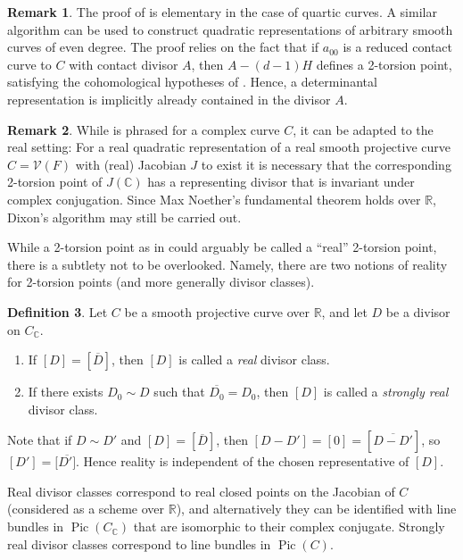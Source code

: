 \documentclass[a4paper,10pt]{amsart}
\theoremstyle{definition}
\newtheorem{Def}{Definition}[section]
\newtheorem{rem}[Def]{Remark}
\theoremstyle{plain}
\newcommand{\Pic}{\operatorname{Pic}}
\newcommand{\cV}{{\mathcal V}}
\newcommand{\C}{{\mathbb C}}
\newcommand{\R}{{\mathbb R}}
\begin{document}
\begin{rem}
The proof of  is elementary in the case of quartic curves. A similar algorithm can be used to construct quadratic representations of arbitrary smooth curves of even degree. The proof relies on the fact that if $a_{00}$ is a reduced contact curve to $C$ with contact divisor $A$, then $A - (d-1)H$ defines a 2-torsion point, satisfying the cohomological hypotheses of . Hence, a determinantal representation is implicitly already contained in the divisor $A$.
\end{rem}

\begin{rem} \label{rem:realDixon}
While  is phrased for a complex curve $C$, it can be adapted to the real setting: For a real quadratic representation of a real smooth projective curve $C = \cV(F)$ with (real) Jacobian $J$ to exist it is necessary that the corresponding 2-torsion point of $J(\C)$ has a representing divisor that is invariant under complex conjugation. Since Max Noether's fundamental theorem holds over $\R$, Dixon's algorithm may still be carried out. 
\end{rem}

While a 2-torsion point as in  could arguably be called a ``real'' 2-torsion point, there is a subtlety not to be overlooked. Namely, there are two notions of reality for 2-torsion points (and more generally divisor classes).

\begin{Def} \label{def:realDivClass}
    Let $C$ be a smooth projective curve over $\R$, and let $D$ be a divisor on $C_\C$.
    \begin{enumerate}
        \item If $[D] = [\overline{D}]$, then $[D]$ is called a \emph{real} divisor class.
        \item If there exists $D_0 \sim D$ such that $\overline{D_0} = D_0$, then $[D]$ is called a \emph{strongly real} divisor class.
    \end{enumerate}
\end{Def}

Note that if $D \sim D'$ and $[D] = [\overline{D}]$, then $[D - D'] = [0] = [\overline{D - D'}]$, so $[D'] = [\overline{D']}$. Hence reality is independent of the chosen representative of $[D]$.

Real divisor classes correspond to real closed points on the Jacobian of $C$ (considered as a scheme over $\R$), and alternatively they can be identified with line bundles in $\Pic(C_\C)$ that are isomorphic to their complex conjugate. Strongly real divisor classes correspond to line bundles in $\Pic(C)$.
\end{document}
